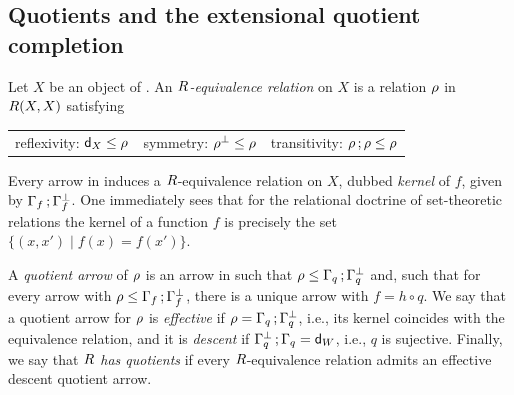 \subsection{Quotients and the extensional quotient completion}
Let $X$ be an object of \CC. 
An \emph{$R$-equivalence relation} on $X$ is a relation 
$\rho$ in $R(X,X)$ satisfying
\begin{center}
\begin{tabular}{lll}
reflexivity: $\mathsf{d}_X\leq\rho$& symmetry: $\rho^{\bot}\leq\rho$&transitivity: $\rho\mathop{\mathbf{;}}\rho\leq\rho$
\end{tabular}
\end{center}
Every arrow  in \CC induces a $R$-equivalence relation on $X$, dubbed \emph{kernel} of $f$, given by $\Gamma_{f}\mathop{\mathbf{;}}\Gamma_{f}^{\bot}$.
One immediately sees that for the relational doctrine \fun{\Rel}{\bop\Set}{\Pos} of set-theoretic relations the kernel of a function $f$ is precisely the set $\{(x,x')\mid f(x)=f(x')\}$. 

A \emph{quotient arrow} of $\rho$ is an arrow  in \CC such that 
$\rho \leq \Gamma_{q}\mathop{\mathbf{;}}\Gamma_{q}^{\bot}$ and, 
such that for every arrow  with $\rho\leq\Gamma_{f}\mathop{\mathbf{;}}\Gamma_{f}^{\bot}$, there is a unique arrow  with $f = h\circ q$.  
We say that a quotient arrow   for $\rho$ is 
\emph{effective} if $\rho = \Gamma_{q}\mathop{\mathbf{;}}\Gamma_{q}^{\bot}$, i.e., its kernel coincides with the equivalence relation, 
and it is \emph{descent} if $\Gamma_{q}^{\bot}\mathop{\mathbf{;}}\Gamma_{q} = \mathsf{d}_W$, i.e., $q$ is sujective. 
%
Finally, we say that \emph{$R$ has quotients} if every $R$-equivalence relation admits an effective descent quotient arrow. 


